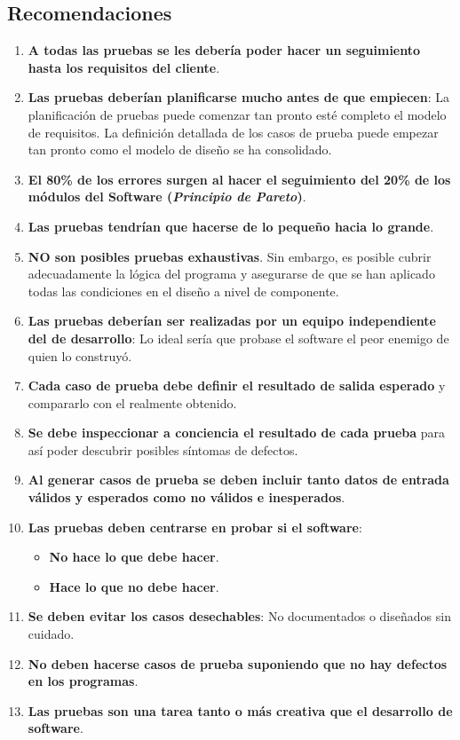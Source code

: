 \subsection{Recomendaciones}

\begin{enumerate}
    \item \textbf{A todas las pruebas se les debería poder hacer un seguimiento hasta los requisitos del cliente}.
    \item \textbf{Las pruebas deberían planificarse mucho antes de que empiecen}: La planificación de pruebas puede comenzar tan pronto esté completo el modelo de requisitos. La definición detallada de los casos de prueba puede empezar tan pronto como el modelo de diseño se ha consolidado.
    \item \textbf{El 80\% de los errores surgen al hacer el seguimiento del 20\% de los módulos del Software (\textit{Principio de Pareto})}.
    \item \textbf{Las pruebas tendrían que hacerse de lo pequeño hacia lo grande}.
    \item \textbf{NO son posibles pruebas exhaustivas}. Sin embargo, es posible cubrir adecuadamente la lógica del programa y asegurarse de que se han aplicado todas las condiciones en el diseño a nivel de componente.
    \item \textbf{Las pruebas deberían ser realizadas por un equipo independiente del de desarrollo}: Lo ideal sería que probase el software el peor enemigo de quien lo construyó.
    \item \textbf{Cada caso de prueba debe definir el resultado de salida esperado} y compararlo con el realmente obtenido.
    \item \textbf{Se debe inspeccionar a conciencia el resultado de cada prueba} para así poder descubrir posibles síntomas de defectos.
    \item \textbf{Al generar casos de prueba se deben incluir tanto datos de entrada válidos y esperados como no válidos e inesperados}.
    \item \textbf{Las pruebas deben centrarse en probar si el software}:
          \begin{itemize}
              \item \textbf{No hace lo que debe hacer}.
              \item \textbf{Hace lo que no debe hacer}.
          \end{itemize}
    \item \textbf{Se deben evitar los casos desechables}: No documentados o diseñados sin cuidado.
    \item \textbf{No deben hacerse casos de prueba suponiendo que no hay defectos en los programas}.
    \item \textbf{Las pruebas son una tarea tanto o más creativa que el desarrollo de software}.
\end{enumerate}




